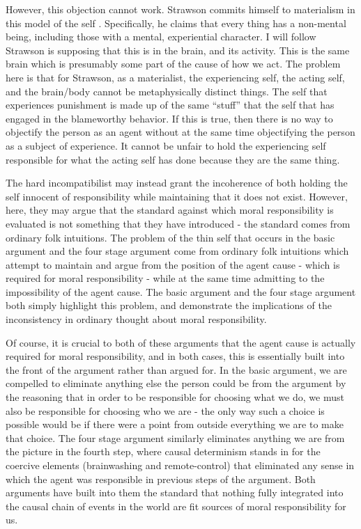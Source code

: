\documentclass[phd,12pt,oneside,paper=letterpaper]{ubcthesis}
\begin{document}
However, this objection cannot work. Strawson commits himself to materialism in this model of the self . Specifically, he claims that every thing has a non-mental being, including those with a mental, experiential character. I will follow Strawson is supposing that this is in the brain, and its activity. This is the same brain which is presumably some part of the cause of how we act. The problem here is that for Strawson, as a materialist, the experiencing self, the acting self, and the brain/body cannot be metaphysically distinct things. The self that experiences punishment is made up of the same ``stuff'' that the self that has engaged in the blameworthy behavior. If this is true, then there is no way to objectify the person as an agent without at the same time objectifying the person as a subject of experience. It cannot be unfair to hold the experiencing self responsible for what the acting self has done because they are the same thing. 

The hard incompatibilist may instead grant the incoherence of both holding the self innocent of responsibility while maintaining that it does not exist. However, here, they may argue that the standard against which moral responsibility is evaluated is not something that they have introduced - the standard comes from ordinary folk intuitions. The problem of the thin self that occurs in the basic argument and the four stage argument come from ordinary folk intuitions which attempt to maintain and argue from the position of the agent cause - which is required for moral responsibility - while at the same time admitting to the impossibility of the agent cause. The basic argument and the four stage argument both simply highlight this problem, and demonstrate the implications of the inconsistency in ordinary thought about moral responsibility. 

Of course, it is crucial to both of these arguments that the agent cause is actually required for moral responsibility, and in both cases, this is essentially built into the front of the argument rather than argued for. In the basic argument, we are compelled to eliminate anything else the person could be from the argument by the reasoning that in order to be responsible for choosing what we do, we must also be responsible for choosing who we are - the only way such a choice is possible would be if there were a point from outside everything we are to make that choice. The four stage argument similarly eliminates anything we are from the picture in the fourth step, where causal determinism stands in for the coercive elements (brainwashing and remote-control) that eliminated any sense in which the agent was responsible in previous steps of the argument. Both arguments have built into them the standard that nothing fully integrated into the causal chain of events in the world are fit sources of moral responsibility for us.
\end{document}
